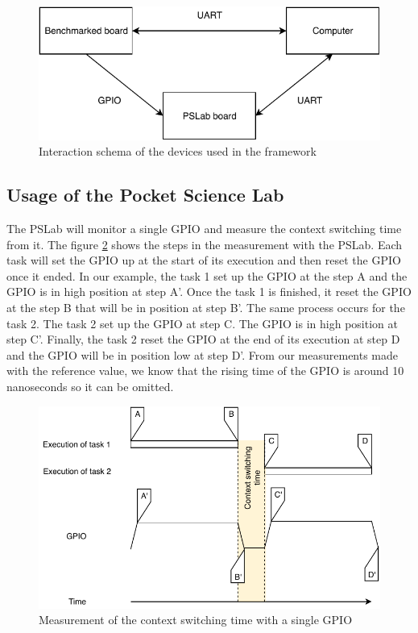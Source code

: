 \begin{figure}[!ht]
  \centering
  \includegraphics[scale=1]{assets/external-benchmarking-framework-schema.pdf}
  \caption{\label{fig:external-benchmarking-framework-schema}Interaction schema of the devices used in the framework}
\end{figure}

\subsection{Usage of the Pocket Science Lab}

The PSLab will monitor a single GPIO and measure the context switching time from it.
The figure \ref{fig:external-framework-context-switching-time-measurement} shows the steps in the measurement with the PSLab.
Each task will set the GPIO up at the start of its execution and then reset the GPIO once it ended.
In our example, the task 1 set up the GPIO at the step A and the GPIO is in high position at step A'.
Once the task 1 is finished, it reset the GPIO at the step B that will be in position at step B'.
The same process occurs for the task 2.
The task 2 set up the GPIO at step C.
The GPIO is in high position at step C'.
Finally, the task 2 reset the GPIO at the end of its execution at step D and the GPIO will be in position low at step D'.
From our measurements made with the reference value, we know that the rising time of the GPIO is around 10 nanoseconds so it can be omitted.

\begin{figure}[!ht]
  \centering
  \includegraphics[scale=1]{assets/external-framework-context-switching-time-measurement.pdf}
  \caption{\label{fig:external-framework-context-switching-time-measurement}Measurement of the context switching time with a single GPIO}
\end{figure}

